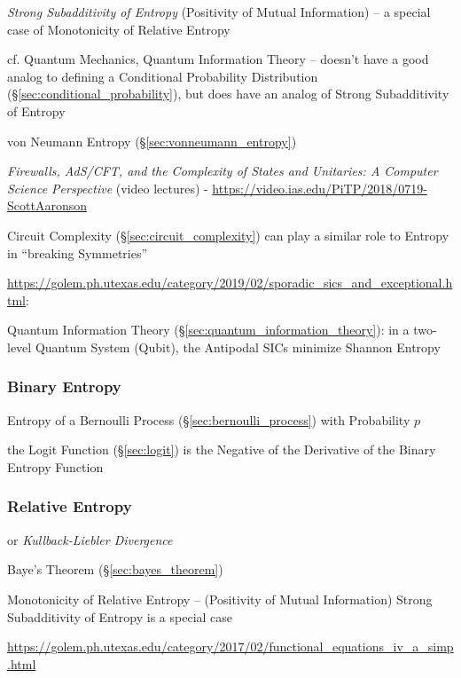 \emph{Strong Subadditivity of Entropy} (Positivity of Mutual Information) --
a special case of Monotonicity of Relative Entropy

cf. Quantum Mechanics, Quantum Information Theory
-- doesn't have a good analog to defining a Conditional Probability Distribution
(\S\ref{sec:conditional_probability}), but does have an analog of Strong
Subadditivity of Entropy

\fist von Neumann Entropy (\S\ref{sec:vonneumann_entropy})

\asterism

\emph{Firewalls, AdS/CFT, and the Complexity of States and Unitaries: A Computer
  Science Perspective}
(video lectures)
-
\url{https://video.ias.edu/PiTP/2018/0719-ScottAaronson}

Circuit Complexity (\S\ref{sec:circuit_complexity}) can play a similar role to
Entropy in ``breaking Symmetries''

\asterism

\url{https://golem.ph.utexas.edu/category/2019/02/sporadic_sics_and_exceptional.html}:

Quantum Information Theory (\S\ref{sec:quantum_information_theory}): in a
two-level Quantum System (Qubit), the Antipodal SICs minimize Shannon Entropy



\subsubsection{Binary Entropy}\label{sec:binary_entropy}

Entropy of a Bernoulli Process (\S\ref{sec:bernoulli_process}) with Probability
$p$

the Logit Function (\S\ref{sec:logit}) is the Negative of the Derivative of the
Binary Entropy Function



\subsubsection{Relative Entropy}\label{sec:relative_entropy}

or \emph{Kullback-Liebler Divergence}

\fist Baye's Theorem (\S\ref{sec:bayes_theorem})

Monotonicity of Relative Entropy -- (Positivity of Mutual Information) Strong
Subadditivity of Entropy is a special case

\url{https://golem.ph.utexas.edu/category/2017/02/functional_equations_iv_a_simp.html}



